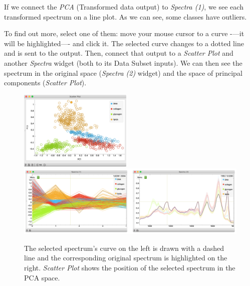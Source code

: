 If we connect the \textit{PCA} (Transformed data output) to \textit{Spectra (1)}, we see each transformed spectrum on a line plot. As we can see, some classes have outliers. 

To find out more, select one of them: move your mouse cursor to a curve -—it will be highlighted—- and click it. The selected curve changes to a dotted line and is sent to the output. Then, connect that output to a \textit{Scatter Plot} and another \textit{Spectra} widget (both to its Data Subset inputs). We can then see the spectrum in the original space (\textit{Spectra (2)} widget) and the space of principal components (\textit{Scatter Plot}).

\begin{figure}[h]
  \vspace{3cm}
  {\includegraphics[width=0.48\textwidth]{graphics/ch-spectral_PCA/spectral_PCA-fig6.png}}
  {\includegraphics[width=\textwidth]{graphics/ch-spectral_PCA/spectral_PCA-fig5.png}}
  \vspace{-3.5cm}
  \caption{The selected spectrum's curve on the left is drawn with a dashed line and the corresponding original spectrum is highlighted on the right. \textit{Scatter Plot} shows the position of the selected spectrum in the PCA space.}
  \label{fig:spectral-PCA-fig5}
\end{figure}

